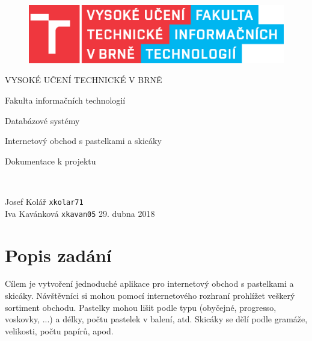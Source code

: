 \documentclass[12pt,a4paper]{article}
\begin{document}
	
	\begin{titlepage}
	\begin{figure}
	\centering
 	\includegraphics[scale=1.0]{obr/logo.eps}
	\end{figure}
	{\centering
	\begin{LARGE}
 	VYSOKÉ UČENÍ TECHNICKÉ V BRNĚ
	\end{LARGE}

	\vspace{20pt}
	\begin{Large}
	Fakulta informačních technologií
	\end{Large}


	\vspace{200pt}

	\begin{Large}
		Databázové systémy
	\end{Large}

	\vspace{10pt}

 	\begin{Huge}
 	Internetový obchod s pastelkami a skicáky
	\end{Huge}
	
	\vspace{10pt}

	\begin{Large}
		Dokumentace k projektu
	\end{Large}
	\\
}
	\vfill
	
	Josef Kolář \texttt{xkolar71}\\ Iva Kavánková \texttt{xkavan05} \hfill 29. dubna 2018

	\end{titlepage}

 	\tableofcontents

\pagestyle{fancy}

	\newpage
 	
	
	\section{Popis zadání}
	Cílem je vytvoření jednoduché aplikace pro internetový obchod s pastelkami a skicáky. Návštěvníci si mohou pomocí internetového rozhraní prohlížet veškerý sortiment obchodu. Pastelky mohou lišit podle typu (obyčejné, progresso, voskovky, ...) a délky, počtu pastelek v balení, atd. Skicáky se dělí podle gramáže, velikosti, počtu papírů, apod.
\end{document}
